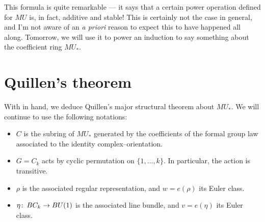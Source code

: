 This formula is quite remarkable --- it says that a certain power operation defined for $MU$ is, in fact, additive and stable!  This is certainly not the case in general, and I'm not aware of an \textit{a priori} reason to expect this to have happened all along.  Tomorrow, we will use it to power an induction to say something about the coefficient ring $MU_*$.



\section{Quillen's theorem}

With  in hand, we deduce Quillen's major structural theorem about $MU_*$.  We will continue to use the following notations:
\begin{itemize}
\item $C$ is the subring of $MU_*$ generated by the coefficients of the formal group law associated to the identity complex--orientation.
\item $G = C_k$ acts by cyclic permutation on $\{1, \ldots, k\}$.  In particular, the action is transitive.
\item $\rho$ is the associated regular representation, and $w = e(\rho)$ its Euler class.
\item $\eta\colon\thinspace BC_k \to BU(1)$ is the associated line bundle, and $v = e(\eta)$ its Euler class.
\end{itemize}

